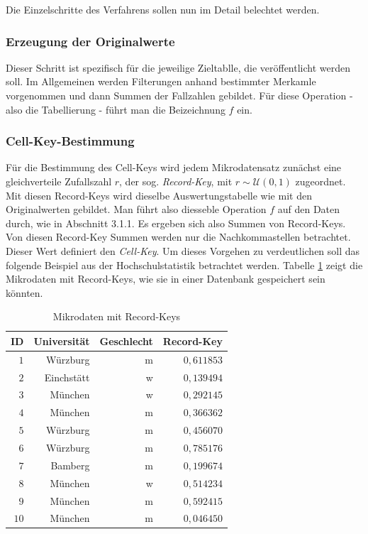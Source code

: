 Die Einzelschritte des Verfahrens sollen nun im Detail belechtet werden.

\subsubsection{Erzeugung der Originalwerte}

Dieser Schritt ist spezifisch für die jeweilige Zieltablle, die veröffentlicht werden soll. Im Allgemeinen werden Filterungen anhand bestimmter Merkamle vorgenommen und dann Summen der Fallzahlen gebildet. Für diese Operation - also die Tabellierung - führt man die Beizeichnung $f$ ein.

\subsubsection{Cell-Key-Bestimmung}

Für die Bestimmung des Cell-Keys wird jedem Mikrodatensatz zunächst eine gleichverteile Zufallszahl $r$, der sog. \textit{Record-Key}, mit $r \sim \mathcal{U}(0, 1)$ zugeordnet. Mit diesen Record-Keys wird dieselbe Auswertungstabelle wie mit den Originalwerten gebildet. Man führt also diesseble  Operation $f$ auf den Daten durch, wie in Abschnitt 3.1.1. Es ergeben sich also Summen von Record-Keys. Von diesen Record-Key Summen werden nur die Nachkommastellen betrachtet. Dieser Wert definiert den \textit{Cell-Key}. Um dieses Vorgehen zu verdeutlichen soll das folgende Beispiel aus der Hochschulstatistik betrachtet werden. Tabelle \ref{tab_mikrodaten} zeigt die Mikrodaten mit Record-Keys, wie sie in einer Datenbank gespeichert sein könnten.

\begin{table}[h]
    \centering
    \begin{tabular}{ r r r r }
        \textbf{ID} \vline & \textbf{Universität} & \textbf{Geschlecht} & \textbf{Record-Key} \\ 
        \hline
        $1$ \vline & Würzburg & m & $0,611853$ \\
        $2$ \vline & Einchstätt & w & $0,139494$ \\
        $3$ \vline & München & w & $0,292145$ \\
        $4$ \vline & München & m & $0,366362$ \\
        $5$ \vline & Würzburg & m & $0,456070$ \\
        $6$ \vline & Würzburg & m & $0,785176$ \\
        $7$ \vline & Bamberg & m & $0,199674$ \\
        $8$ \vline & München & w & $0,514234$ \\
        $9$ \vline & München & m & $0,592415$ \\
        $10$ \vline & München & m & $0,046450$
    \end{tabular}
    \caption{Mikrodaten mit Record-Keys}
    \label{tab_mikrodaten}
\end{table}

